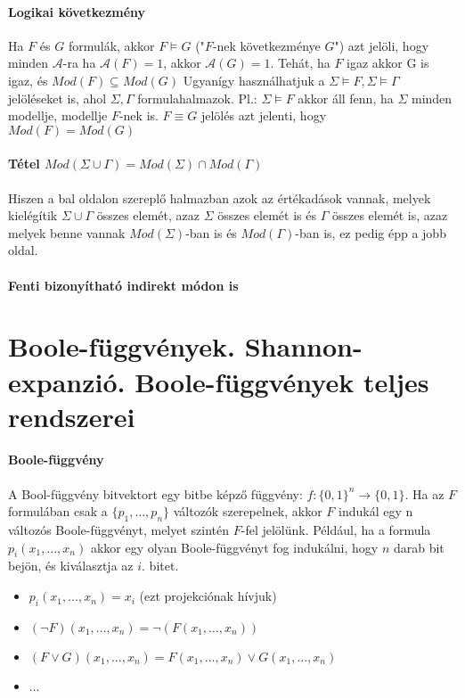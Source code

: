 \documentclass[10pt,a4paper]{article}
\begin{document}
\paragraph{Logikai következmény}
Ha $F$ és $G$ formulák, akkor $F \models G$ ("$F$-nek következménye $G$") azt jelöli, hogy minden $\mathcal{A}$-ra ha $\mathcal{A}(F)=1$, akkor $\mathcal{A}(G)=1$. Tehát, ha $F$ igaz akkor G is igaz, és $Mod(F) \subseteq Mod(G)$
Ugyanígy használhatjuk a $\Sigma \models F, \Sigma \models \Gamma$ jelöléseket is, ahol $\Sigma, \Gamma$ formulahalmazok. Pl.: $\Sigma \models F$ akkor áll fenn, ha $\Sigma$ minden modellje, modellje $F$-nek is. $F \equiv G$ jelölés azt jelenti, hogy $Mod(F) = Mod(G)$
\paragraph{Tétel $Mod(\Sigma \cup \Gamma) = Mod(\Sigma) \cap Mod(\Gamma)$}  Hiszen a bal oldalon szereplő halmazban azok az értékadások vannak, melyek kielégítik $\Sigma \cup \Gamma$ összes elemét, azaz $\Sigma$ összes elemét is és $\Gamma$ összes elemét is, azaz melyek benne vannak $Mod(\Sigma)$-ban is és  $Mod(\Gamma)$-ban is, ez pedig épp a jobb oldal.
\paragraph{Fenti bizonyítható indirekt módon is}


\newpage
\section{Boole-függvények. Shannon-expanzió. Boole-függvények teljes rendszerei}
\paragraph{Boole-függvény}
A Bool-függvény bitvektort egy bitbe képző függvény: $f: \{0,1\}^{n} \rightarrow \{0,1\}.$ Ha az $F$ formulában csak a $\{p_{1}, \ldots, p_{n}\}$ változók szerepelnek, akkor $F$ indukál egy n változós Boole-függvényt, melyet szintén $F$-fel jelölünk. Például, ha a formula $p_{i}(x_{1}, \ldots, x_{n})$ akkor egy olyan Boole-függvényt fog indukálni, hogy $n$ darab bit bejön, és kiválasztja az $i.$ bitet.
\begin{itemize}
\item $p_{i}(x_{1}, \ldots, x_{n}) = x_{i}$ (ezt projekciónak hívjuk)
\item $(\neg F)(x_{1}, \ldots, x_{n}) = \neg(F(x_{1}, \ldots, x_{n}))$
\item $(F \vee G)(x_{1}, \ldots, x_{n}) = F(x_{1}, \ldots, x_{n}) \vee G(x_{1}, \ldots, x_{n})$
\item $\ldots$
\end{itemize}
\end{document}

